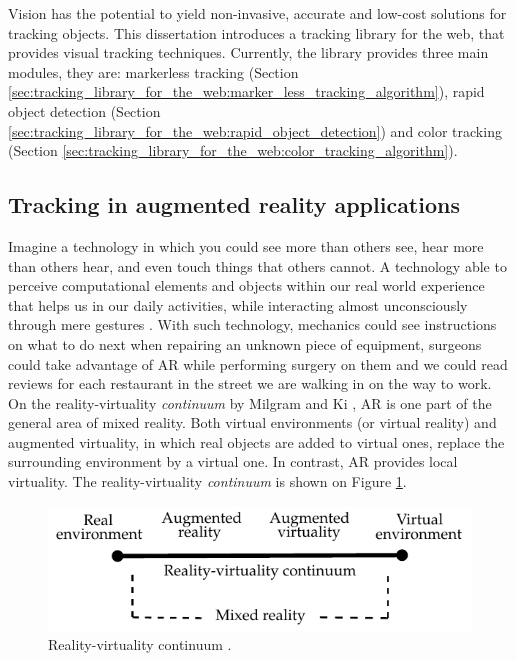 Vision has the potential to yield non-invasive, accurate and low-cost solutions for tracking objects. This dissertation introduces a tracking library for the web, that provides visual tracking techniques. Currently, the library provides three main modules, they are: markerless tracking (Section \ref{sec:tracking_library_for_the_web:marker_less_tracking_algorithm}), rapid object detection (Section \ref{sec:tracking_library_for_the_web:rapid_object_detection}) and color tracking (Section \ref{sec:tracking_library_for_the_web:color_tracking_algorithm}).


\subsection{Tracking in augmented reality applications} %
\label{sub:basic_concepts:visual_tracking:tracking_in_augmented_reality_applications}

Imagine a technology in which you could see more than others see, hear more than others hear, and even touch things that others cannot. A technology able to perceive computational elements and objects within our real world experience that helps us in our daily activities, while interacting almost unconsciously through mere gestures \cite{Krevelen2010,Teichrieb2007}. With such technology, mechanics could see instructions on what to do next when repairing an unknown piece of equipment, surgeons could take advantage of AR while performing surgery on them and we could read reviews for each restaurant in the street we are walking in on the way to work. On the reality-virtuality \textit{continuum} by Milgram and Ki \cite{Mistry2009}, AR is one part of the general area of mixed reality. Both virtual environments (or virtual reality) and augmented virtuality, in which real objects are added to virtual ones, replace the surrounding environment by a virtual one. In contrast, AR provides local virtuality. The reality-virtuality \textit{continuum} is shown on Figure \ref{figure:reality_continuum}.

\begin{figure}[!htb]
  \centering
  \includegraphics{chapters/basic_concepts/reality_continuum.pdf}
  \caption{Reality-virtuality continuum \cite{Benford1998}.}
  \label{figure:reality_continuum}
\end{figure}

